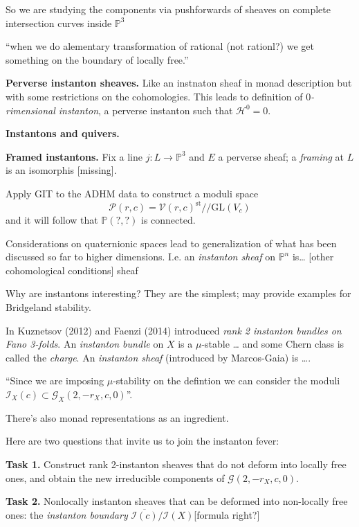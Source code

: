 \documentclass{book}
\begin{document}
So we are studying the components via
pushforwards of sheaves on complete
intersection curves inside $\mathbb{P}^3$

``when we do alementary transformation of
rational (not rationl?) we get
something on the boundary of locally free.''

\medskip\noindent
{\bf Perverse instanton sheaves.} Like an
instnaton sheaf in monad description but with
some restrictions on the cohomologies. This
leads to definition of {\it $0$-rimensional
instanton}, a perverse instanton such that
$\mathcal{H}^0=0$.

\medskip\noindent
{\bf Instantons and quivers.}

\medskip\noindent
{\bf Framed instantons.} Fix a line $j:L\to
\mathbb{P}^3$ and $E$ a perverse
sheaf; a {\it framing} at $L$ is an
isomorphis [missing].

Apply GIT to the ADHM data to construct a
moduli space
$$
\mathcal{P}(r,c)=\mathcal{V}(r,c)^{\text{st}}
/\!/\text{GL}(V_c)
$$
and it will follow that $\mathbb{P}(?,?)$ is
connected.

\medskip\noindent

Considerations on quaternionic spaces lead to
generalization of what has been discussed so
far to higher dimensions. I.e. an {\it
instanton sheaf} on $\mathbb{P}^n$ is… [other
cohomological conditions] sheaf

Why are instantons interesting? They are the
simplest; may provide examples for Bridgeland
stability.

In Kuznetsov (2012) and Faenzi (2014)
introduced {\it rank 2 instanton bundles on
Fano 3-folds}. An {\it instanton bundle} on
$X$ is a $\mu$-stable … and some Chern class
is called the {\it charge}. An {\it instanton
sheaf} (introduced by Marcos-Gaia) is ….

 ``Since we are imposing $\mu$-stability on
the defintion we can consider the moduli
$\mathcal{I}_X(c) \subset
\mathcal{G}_X(2,-r_X,c,0)$''.

There's also monad representations as an
ingredient.

\medskip\noindent
Here are two questions that invite us to join
the instanton fever:

\medskip\noindent
{\bf Task 1.} Construct rank 2-instanton
sheaves that do not deform into locally free
ones, and obtain the new irreducible
components of $\mathcal{G}(2,-r_X,c,0)$.

\medskip\noindent
{\bf Task 2.} Nonlocally instanton sheaves
that can be deformed into non-locally free
ones: the {\it instanton boundary}
$\overline{\mathcal{I}(c)}/\mathcal{I}(X)
$[formula
right?]
\end{document}
